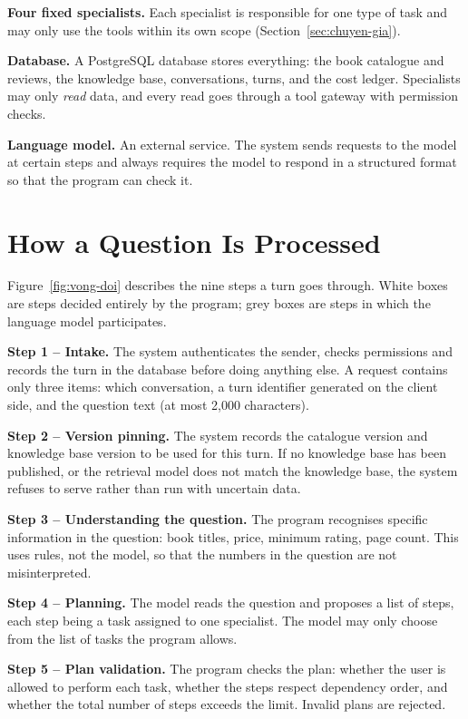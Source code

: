 \textbf{Four fixed specialists.} Each specialist is responsible for one type of task and may only use the tools within its own scope (Section~\ref{sec:chuyen-gia}).

\textbf{Database.} A PostgreSQL database stores everything: the book catalogue and reviews, the knowledge base, conversations, turns, and the cost ledger. Specialists may only \emph{read} data, and every read goes through a tool gateway with permission checks.

\textbf{Language model.} An external service. The system sends requests to the model at certain steps and always requires the model to respond in a structured format so that the program can check it.

\section{How a Question Is Processed}
\label{sec:vong-doi}

Figure~\ref{fig:vong-doi} describes the nine steps a turn goes through. White boxes are steps decided entirely by the program; grey boxes are steps in which the language model participates.


\textbf{Step 1 -- Intake.} The system authenticates the sender, checks permissions and records the turn in the database before doing anything else. A request contains only three items: which conversation, a turn identifier generated on the client side, and the question text (at most 2,000 characters).

\textbf{Step 2 -- Version pinning.} The system records the catalogue version and knowledge base version to be used for this turn. If no knowledge base has been published, or the retrieval model does not match the knowledge base, the system refuses to serve rather than run with uncertain data.

\textbf{Step 3 -- Understanding the question.} The program recognises specific information in the question: book titles, price, minimum rating, page count. This uses rules, not the model, so that the numbers in the question are not misinterpreted.

\textbf{Step 4 -- Planning.} The model reads the question and proposes a list of steps, each step being a task assigned to one specialist. The model may only choose from the list of tasks the program allows.

\textbf{Step 5 -- Plan validation.} The program checks the plan: whether the user is allowed to perform each task, whether the steps respect dependency order, and whether the total number of steps exceeds the limit. Invalid plans are rejected.

